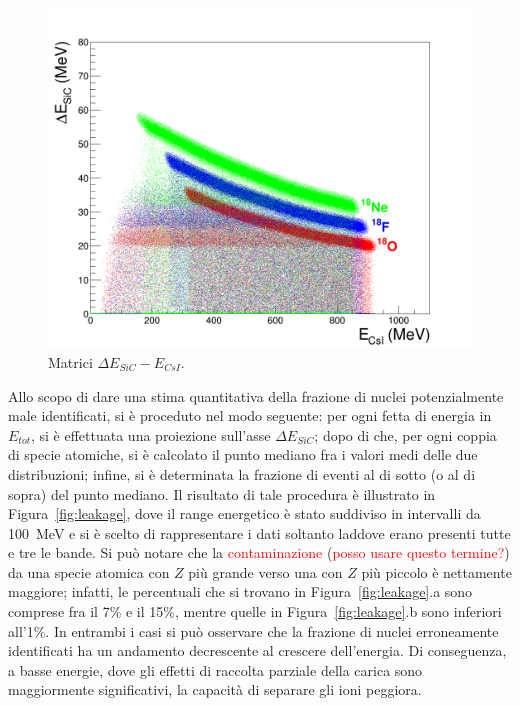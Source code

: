 \begin{figure} [!t]
	\centering
	\includegraphics[width=\textwidth, keepaspectratio]{Grafici_Tesi/Particelle_non_monocromatiche_Resid/deltaE_ERes.png}
	\caption{Matrici $\Delta E_{SiC} - E_{CsI}$.} \label{fig:deltaE_ERes}
\end{figure}






Allo scopo di dare una stima quantitativa della frazione di nuclei potenzialmente male identificati, si è proceduto nel modo seguente: per ogni fetta di energia in $E_{tot}$, si è effettuata una proiezione sull'asse $\Delta E_{SiC}$; dopo di che, per ogni coppia di specie atomiche, si è calcolato il punto mediano fra i valori medi delle due distribuzioni; infine, si è determinata la frazione di eventi al di sotto (o al di sopra) del punto mediano.
Il risultato di tale procedura è illustrato in Figura~\ref{fig:leakage}, dove il range energetico è stato suddiviso in intervalli da 100~MeV e si è scelto di rappresentare i dati soltanto laddove erano presenti tutte e tre le bande.
Si può notare che la \textcolor{red}{contaminazione} (\textcolor{red}{posso usare questo termine?}) da una specie atomica con $Z$ più grande verso una con $Z$ più piccolo è nettamente maggiore; infatti, le percentuali che si trovano in Figura~\ref{fig:leakage}.a sono comprese fra il 7\% e il 15\%, mentre quelle in Figura~\ref{fig:leakage}.b sono inferiori all'1\%.
In entrambi i casi si può osservare che la frazione di nuclei erroneamente identificati ha un andamento decrescente al crescere dell'energia.
Di conseguenza, a basse energie, dove gli effetti di raccolta parziale della carica sono maggiormente significativi, la capacità di separare gli ioni peggiora.



